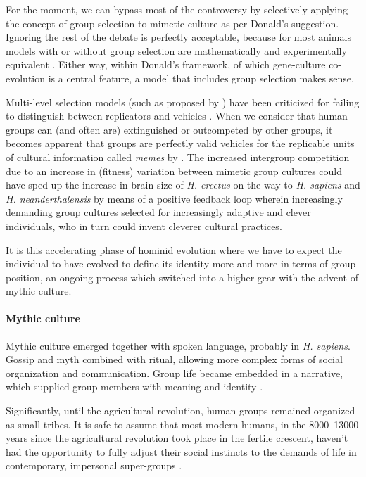 \documentclass{article}
\begin{document}
For the moment, we can bypass most of the controversy by selectively applying the
concept of group selection to mimetic culture as per Donald's suggestion.
Ignoring the rest of the debate is perfectly acceptable, because for most
animals models with or without group selection are mathematically and
experimentally equivalent \citep{dennett2002}. Either way, within Donald's
framework, of which gene-culture co-evolution is a central feature, a model
that includes group selection makes sense.

Multi-level selection models (such as proposed by \citealp{sober1999}) have
been criticized for failing to distinguish between replicators and vehicles
\citep{dennett2002}.  When we consider that human groups can (and often are)
extinguished or outcompeted by other groups, it becomes apparent that groups are
perfectly valid vehicles for the replicable units of cultural information called
\emph{memes} by \citet{dawkins1976}. The increased intergroup competition due
to an increase in (fitness) variation between mimetic group cultures could have
sped up the increase in brain size of \textit{H. erectus} on the way to
\textit{H. sapiens} and \textit{H. neanderthalensis} by means of a positive
feedback loop wherein increasingly demanding group cultures selected for
increasingly adaptive and clever individuals, who in turn could invent cleverer
cultural practices.

It is this accelerating phase of hominid evolution where we have to expect the
individual to have evolved to define its identity more and more in terms of
group position, an ongoing process which switched into a higher gear with the
advent of mythic culture.

\paragraph{Mythic culture}

Mythic culture emerged together with spoken language, probably in \textit{H.
sapiens}. Gossip and myth combined with ritual, allowing more complex forms of
social organization and communication. Group life became embedded in a
narrative, which supplied group members with meaning and identity \citep{donald1991}. 

Significantly, until the agricultural revolution, human groups remained
organized as small tribes. It is safe to assume that most modern humans, in the
8000--13000 years since the agricultural revolution took place in the fertile
crescent, haven't had the opportunity to fully adjust their social instincts to
the demands of life in contemporary, impersonal super-groups \citep{quinn1992}.
\end{document}
